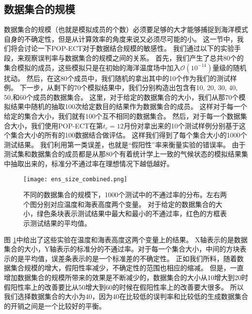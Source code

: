 \subsection{数据集合的规模} \label{verify:ens}

 
数据集合的规模（也就是模拟成员的个数）必须要足够的大才能够捕捉到海洋模式自身的不确定性，但是从计算效率的角度来说又必须尽可能的小。
这一节中，我们将会讨论一下POP-ECT对于数据结合规模的敏感性。
我们通过以下的实验手段，来观察误判率与数据集合的规模之间的关系。 
首先，我们产生了总共80个的集合模拟的成员，这些模拟只是在初始的海洋温度场中加入$\mathcal{O}(10^{-14})$量级的随机扰动。 
然后，在这80个成员中，我们随机的拿出其中的10个作为我们的测试样例。 
下一步，从剩下的70个模拟结果中，我们分别构造出包含有10, 20, 30, 40, 50,和60个成员的数据集合。 
这里，对于给定的数据集合的大小，我们从那70个模拟结果中随机的抽取100次给定数目的结果作为数据集合的成员。
这样对于每一个给定的集合大小，我们就有100个互不相同的数据集合。 
然后，对于每一个数据集合大小，我们使用POP-ECT在第$t_c = 12$月份对拿出来的10个测试样例分别基于这个集合大小的所有的100数据结合做评估。
这样我们得到了每个集合大小的1000个测试结果。
我们利用第一类误差，也就是“假阳性”率来衡量实验的错误率。 
由于测试集和数据集合的成员都是从那80个有着统计学上一致的气候状态的模拟结果集中抽取出来的，标准分不通过率在理想情况下越低越好。 


\begin{figure} 
\centering
\texttt{[image: ens\_size\_combined.png]}
\caption{ 不同的数据集合的规模下，1000个测试中的不通过率的分布。左右两个图分别对应温度和海表高度两个变量。
对于给定的数据集合的大小，绿色条块表示测试结果中最大和最小的不通过率，红色的方框表示测试结果的平均值。}
\label{fig:temp_ens_80}
\end {figure}

图 \ref{fig:temp_ens_80}中给出了这些实验在温度和海表高度这两个变量上的结果。 
X轴表示的是数据集合的大小，Y轴表示的标准分的不通过率。对于每一个集合大小，中间的方块表示的是平均值，误差条表示的是一个标准差的不确定性。
正如我们所料，随着数据集合规模的增大，假阳性率减少，不确定性的范围也相应的缩减。 
但是，一直增加数据集合的规模所带来的效果是不断减少的，数据集合的大小从10增大到20时假阳性率上的改善要比从50增大到60的时候在假阳性率上的改善要大很多。 
所以我们选择数据集合的大小为40，因为40在比较低的误判率和比较低的生成数据集合的开销之间是一个比较好的平衡。 
 
